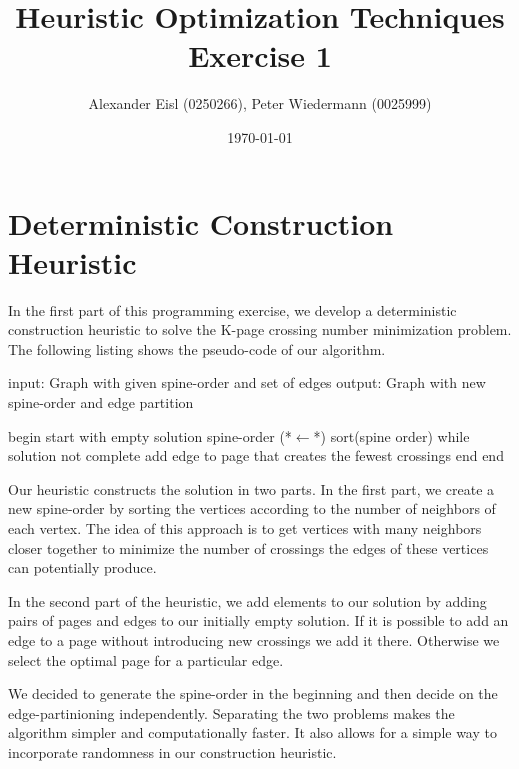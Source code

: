 \documentclass{scrartcl}
\author{Alexander Eisl (0250266), Peter Wiedermann (0025999)}
\date{\today}
\title{Heuristic Optimization Techniques \\ Exercise 1}
\begin{document}
\maketitle


\section{Deterministic Construction Heuristic}
In the first part of this programming exercise, we develop a
deterministic construction heuristic to solve the K-page crossing
number minimization problem. The following listing shows the
pseudo-code of our algorithm.

\begin{algorithm}[caption={Deterministic construction heuristic}]
    input: Graph with given spine-order and set of edges
    output: Graph with new spine-order and edge partition

    begin
       start with empty solution
       spine-order (*$\leftarrow$*) sort(spine order)
       while solution not complete
           add edge to page that creates the fewest crossings
       end 
    end
\end{algorithm}

Our heuristic constructs the solution in two parts. In the first part,
we create a new spine-order by sorting the vertices according to the
number of neighbors of each vertex. The idea of this approach is to
get vertices with many neighbors closer together to minimize the
number of crossings the edges of these vertices can potentially
produce.

In the second part of the heuristic, we add elements to our solution
by adding pairs of pages and edges to our initially empty solution.
If it is possible to add an edge to a page without introducing new
crossings we add it there. Otherwise we select the optimal page for a
particular edge.

We decided to generate the spine-order in the beginning and then
decide on the edge-partinioning independently. Separating the two
problems makes the algorithm simpler and computationally faster. It
also allows for a simple way to incorporate randomness in our
construction heuristic.
\end{document}
